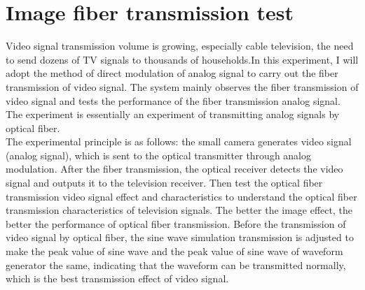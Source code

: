 \documentclass[a4paper]{article}
\begin{document}
\section{Image fiber transmission test}
\label{sec:Sec9}
Video signal transmission volume is growing, especially cable television, the need to send dozens of TV signals to thousands of households.In this experiment, I will adopt the method of direct modulation of analog signal to carry out the fiber transmission of video signal. The system mainly observes the fiber transmission of video signal and tests the performance of the fiber transmission analog signal. The experiment is essentially an experiment of transmitting analog signals by optical fiber.
\\

The experimental principle is as follows: the small camera generates video signal (analog signal), which is sent to the optical transmitter through analog modulation. After the fiber transmission, the optical receiver detects the video signal and outputs it to the television receiver. Then test the optical fiber transmission video signal effect and characteristics to understand the optical fiber transmission characteristics of television signals. The better the image effect, the better the performance of optical fiber transmission. Before the transmission of video signal by optical fiber, the sine wave simulation transmission is adjusted to make the peak value of sine wave and the peak value of sine wave of waveform generator the same, indicating that the waveform can be transmitted normally, which is the best transmission effect of video signal.
\\
\end{document}
